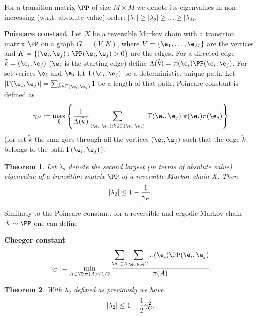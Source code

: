 \documentclass[a4paper,12pt]{article}
\newtheorem{theorem}{Theorem}
\begin{document}
 
\noindent
 {
\setlength\fboxsep{4pt}%
 \setlength\fboxrule{2pt}%
 } \bigskip\bigskip
\par \bigskip

 
  For a transition matrix $\PP$  of size $M\times M $ we denote its eigenvalues in non-increasing (w.r.t. absolute value) 
  order: $|\lambda_1|\geq|\lambda_2|\geq \ldots\geq |\lambda_M$.
\medskip\par 
  \textbf{Poincare constant}. Let $X$ be a reversible Markov chain with a transition matrix $\PP$ on a graph $G=(V,K)$, where $V=\{\e_1,\ldots,\e_M\}$ are the vertices and $K=\{(\e_i,\e_j): \PP(\e_i,\e_j)>0\}$ are the edges. For a directed edge $\tilde{k}=(\e_i,\e_j)$ ($\e_i$ is the starting edge) define $\Lambda(\tilde{k})=\pi(\e_i)\PP(\e_i,\e_j)$. For set verices $\e_i$ and $\e_j$ let $\Gamma(\e_i,\e_j)$ be a deterministic, unique path. Let $|\Gamma(\e_i,\e_j)|=\sum_{\tilde{k}\in\Gamma(\e_i,\e_j)} 1$ be a length of that path.
Poincare constant is defined as 
$$\gamma_P:=\max_{\tilde{k}} \left\{ {1\over \Lambda{(\tilde{k})}} \sum_{(\e_i,\e_j): \tilde{k}\in\Gamma(\e_i,\e_j)} |\Gamma(\e_i,\e_j)| \pi(\e_i)\pi(\e_j) \right\}$$
(for set $\tilde{k}$ the sum goes through all the vertices $(\e_i,\e_j)$ such that the edge $\tilde{k}$ belongs to the path $\Gamma(\e_i,\e_j)$).

\begin{theorem}
Let $\lambda_2$ denote the second largest (in terms of absolute value) eigenvalue of a transition matrix $\PP$ of a reversible Markov chain $X$. Then
$$|\lambda_2|\leq 1-{1\over\gamma_P}.$$
\end{theorem}

Similarly to the Poincare constant, for a reversible and ergodic Markov chain $X\sim \PP$  one can define  \par 
\textbf{Cheeger constant}
$$\gamma_C:=\min_{A\subset\E: \pi(A)\leq 1/2} { \displaystyle  \sum_{\e_i\in A} \sum_{\e_j\in A^C} \pi(\e_i)\PP(\e_i,\e_j) \over \pi(A)}.$$
\begin{theorem} With $\lambda_2$ defined as previously we have
$$|\lambda_2|\leq 1-{1\over 2}\gamma_C^2.$$
\end{theorem}
 
\end{document}

